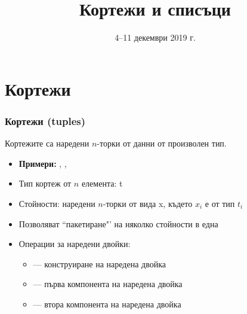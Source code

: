 \documentclass[alsotrans]{beamerswitch}
\title{Кортежи и списъци}
\date{4--11 декември 2019 г.}
\begin{document}
\begin{frame}
  \titlepage
\end{frame}
\section{Кортежи}

\begin{frame}
  \frametitle{Кортежи (tuples)}

  Кортежите са наредени $n$-торки от данни от произволен тип.
  \begin{itemize}[<+->]
  \item \textbf{Примери:} , , 
  \item Тип кортеж от $n$ елемента: \tuple t
  \item Стойности: наредени $n$-торки от вида \tuple x, където $x_i$ е от тип $t_i$
  \item Позволяват ``пакетиране"' на няколко стойности в една
  \item Операции за наредени двойки:
    \begin{itemize}
    \item {} --- конструиране на наредена двойка
    \item {} --- първа компонента на наредена двойка
    \item {} --- втора компонента на наредена двойка
    \end{itemize}
  \end{itemize}
\end{frame}
\end{document}
